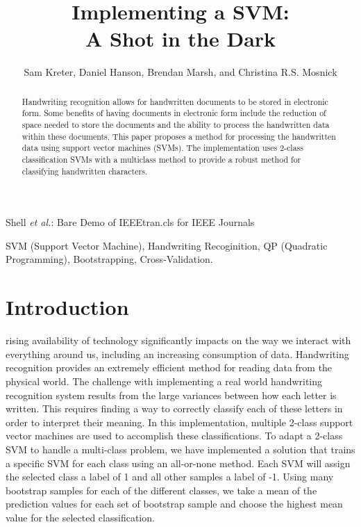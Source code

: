 \documentclass[journal]{IEEEtran}
\begin{document}
\title{Implementing a SVM:\\ A Shot in the Dark}


\author{Sam Kreter, Daniel Hanson, Brendan Marsh, and Christina R.S. Mosnick}

{Shell \MakeLowercase{\textit{et al.}}: Bare Demo of IEEEtran.cls for IEEE Journals}

\maketitle

\begin{abstract}
Handwriting recognition allows for handwritten documents to be stored in electronic form. Some benefits of having documents in electronic form include the reduction of space needed to store the documents and the ability to process the handwritten data within these documents. This paper proposes a method for processing the handwritten data using support vector machines (SVMs). The implementation uses 2-class classification SVMs with a multiclass method to provide a robust method for classifying handwritten characters.
\end{abstract}

\begin{IEEEkeywords}
    SVM (Support Vector Machine), Handwriting Recoginition, QP (Quadratic Programming), Bootstrapping, Cross-Validation.
\end{IEEEkeywords}

\IEEEpeerreviewmaketitle

\section{Introduction}

 rising availability of technology significantly impacts on the way we interact with everything around us, including an increasing consumption of data. Handwriting recognition provides an extremely efficient method for reading data from the physical world. The challenge with implementing a real world handwriting recognition system results from the large variances between how each letter is written. This requires finding a way to correctly classify each of these letters in order to interpret their meaning. In this implementation, multiple 2-class support vector machines are used to accomplish these classifications. To adapt a 2-class SVM to handle a multi-class problem, we have implemented a solution that trains a specific SVM for each class using an all-or-none method. Each SVM will assign the selected class a label of 1 and all other samples a label of -1. Using many bootstrap samples for each of the different classes, we take a mean of the prediction values for each set of bootstrap sample and choose the highest mean value for the selected classification.\\
\end{document}
